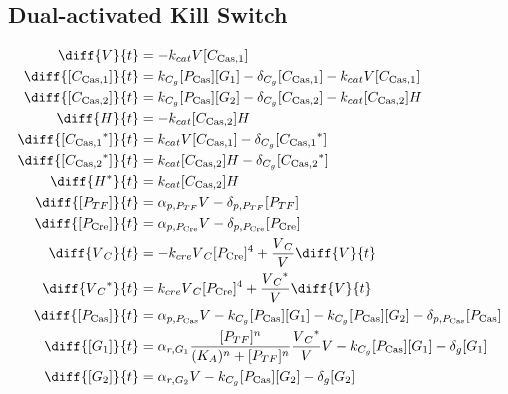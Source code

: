 \subsection{Dual-activated Kill Switch}
\label{s:Joint_delayed_kill_switch}

\begin{align}
\diff{\vectorGen{}}{t} & = - \casCutRate{{}}\vectorGen{}\conc{\cplx{\cas}{1}}\\
\diff{\conc{\cplx{\cas}{1}}}{t} & =  \gRnaBind{}\conc{\proSp{\cas{}}}\conc{\gRna{1}} - \casCompDegradeRate{}\conc{\cplx{\cas}{1}} - \casCutRate{{}}\vectorGen{}\conc{\cplx{\cas}{1}}\\
\diff{\conc{\cplx{\cas}{2}}}{t} & =  \gRnaBind{}\conc{\proSp{\cas{}}}\conc{\gRna{2}} - \casCompDegradeRate{}\conc{\cplx{\cas}{2}} - \casCutRate{{}}\conc{\cplx{\cas}{2}}\hostGen{}\\
\diff{\hostGen{}}{t} & = - \casCutRate{{}}\conc{\cplx{\cas}{2}}\hostGen{}\\
\diff{\conc{\bound{\cplx{\cas}{1}}}}{t} & =  \casCutRate{{}}\vectorGen{}\conc{\cplx{\cas}{1}} - \casCompDegradeRate{}\conc{\bound{\cplx{\cas}{1}}}\\
\diff{\conc{\bound{\cplx{\cas}{2}}}}{t} & =  \casCutRate{{}}\conc{\cplx{\cas}{2}}\hostGen{} - \casCompDegradeRate{}\conc{\bound{\cplx{\cas}{2}}}\\
\diff{\edited{\hostGen{}}}{t} & =  \casCutRate{{}}\conc{\cplx{\cas}{2}}\hostGen{}\\
\diff{\conc{\proSp{TF}}}{t} & =  \txtlRate{\proSp{TF}}\vectorGen{} - \proDegradeRate{\proSp{TF}}\conc{\proSp{TF}}\\
\diff{\conc{\proSp{\cre{}}}}{t} & =  \txtlRate{\proSp{\cre{}}}\vectorGen{} - \proDegradeRate{\proSp{\cre{}}}\conc{\proSp{\cre{}}}\\
\diff{\vectorGen{}_C}{t} & = - \creCutRate{} \vectorGen{}_C \conc{\proSp{\cre{}}}^4 + \frac{\vectorGen{}_C}{\vectorGen{}} \diff{\vectorGen{}}{t}\\
\diff{\edited{\vectorGen{}_C}}{t} & =  \creCutRate{} \vectorGen{}_C \conc{\proSp{\cre{}}}^4 + \frac{\edited{\vectorGen{}_C}}{\vectorGen{}} \diff{\vectorGen{}}{t}\\
\diff{\conc{\proSp{\cas{}}}}{t} & =  \txtlRate{\proSp{\cas{}}}\vectorGen{} - \gRnaBind{}\conc{\proSp{\cas{}}}\conc{\gRna{1}} - \gRnaBind{}\conc{\proSp{\cas{}}}\conc{\gRna{2}} - \proDegradeRate{\proSp{\cas{}}}\conc{\proSp{\cas{}}}\\
\diff{\conc{\gRna{1}}}{t} & =  \txRate{\gRna{1}}\frac{\conc{\proSp{TF}}^n}{(K_A)^n + \conc{\proSp{TF}}^n}\frac{\edited{\vectorGen{}_C}}{\vectorGen{}}\vectorGen{} - \gRnaBind{}\conc{\proSp{\cas{}}}\conc{\gRna{1}} - \rnaDegradeRate{}\conc{\gRna{1}}\\
\diff{\conc{\gRna{2}}}{t} & =  \txRate{\gRna{2}}\vectorGen{} - \gRnaBind{}\conc{\proSp{\cas{}}}\conc{\gRna{2}} - \rnaDegradeRate{}\conc{\gRna{2}}
\end{align}


